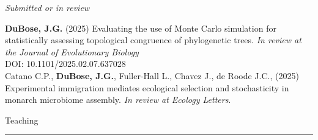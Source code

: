 \documentclass{article}
\begin{document}
\begin{flushleft}
\emph{Submitted or in review}
\end{flushleft}

\hangindent=0.7cm \textbf{DuBose, J.G.} (2025) Evaluating the use of Monte Carlo simulation for statistically assessing topological congruence of phylogenetic trees. \emph{In review at the Journal of Evolutionary Biology}\\
DOI: 10.1101/2025.02.07.637028 \\

\hangindent=0.7cm Catano C.P., \textbf{DuBose, J.G.}, Fuller-Hall L., Chavez J., de Roode J.C., (2025) Experimental immigration mediates ecological selection and stochasticity in monarch microbiome assembly. \emph{In review at Ecology Letters}. \\

\pagebreak
\begin{flushleft}
{\Large Teaching} \rule{16.51cm}{0.4pt}\\
\end{flushleft}
\end{document}
